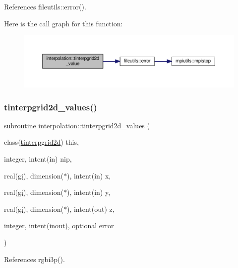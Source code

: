 References fileutils\+::error().

Here is the call graph for this function\+:
\nopagebreak
\begin{figure}[H]
\begin{center}
\leavevmode
\includegraphics[width=350pt]{namespaceinterpolation_a77feb149313f842af954a528b8bff58e_cgraph}
\end{center}
\end{figure}
\mbox{\label{namespaceinterpolation_ad36dce10ba7587405b8862f7bea68d33}} 
\subsubsection{\texorpdfstring{tinterpgrid2d\+\_\+values()}{tinterpgrid2d\_values()}}
{\footnotesize\ttfamily subroutine interpolation\+::tinterpgrid2d\+\_\+values (\begin{DoxyParamCaption}\item[{class(\mbox{\hyperlink{structinterpolation_1_1tinterpgrid2d}{tinterpgrid2d}})}]{this,  }\item[{integer, intent(in)}]{nip,  }\item[{real(\mbox{\hyperlink{namespaceinterpolation_a7242dea48715e8170bae81efe12c64be}{gi}}), dimension($\ast$), intent(in)}]{x,  }\item[{real(\mbox{\hyperlink{namespaceinterpolation_a7242dea48715e8170bae81efe12c64be}{gi}}), dimension($\ast$), intent(in)}]{y,  }\item[{real(\mbox{\hyperlink{namespaceinterpolation_a7242dea48715e8170bae81efe12c64be}{gi}}), dimension($\ast$), intent(out)}]{z,  }\item[{integer, intent(inout), optional}]{error }\end{DoxyParamCaption})}



References rgbi3p().

